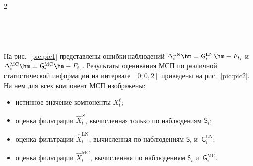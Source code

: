 \begin{multicols}{2}
\begin{figure*} %
  \vspace*{1pt}
\begin{center}
   \mbox{%
\epsfxsize=135.581mm 
}
\end{center}
\vspace*{-9pt}
\label{pic:pic1}
   \vspace*{6pt}
\begin{center}
   \mbox{%
\epsfxsize=135.178mm 
}
\end{center}
\vspace*{-9pt}
\label{pic:pic2}
\end{figure*}

На рис.~\ref{pic:pic1} представлены ошибки наблюдений $\Delta_i^{\mathrm{LN}}\hm = 
\mathsf{G}_i^{\mathrm{LN}} \hm- F_{t_i}$ и~$\Delta_i^{\mathrm{MC}}\hm = \mathsf{G}_i^{\mathrm{MC}}\hm - F_{t_i}$.
Результаты оценивания МСП по различной статистической информации на интервале 
$[0;0{,}2]$ приведены на рис.~\ref{pic:pic2}. На нем для всех компонент МСП 
изобра\-жены:\\[-14pt]
\begin{itemize}
\item
истинное значение компоненты $X_t^{\ell}$;\\[-14pt]
\item
оценка фильтрации $\widehat{X}_t^{S}$, вычисленная только по наблюдениям 
$\mathsf{S}_i$;\\[-14pt]
\item
оценка фильтрации $\widehat{X}_t^{\mathrm{LN}}$, вычисленная по наблюдениям 
$\mathsf{S}_i$ и~$\mathsf{G}_i^{\mathrm{LN}}$;\\[-14pt]
\item
оценка фильтрации $\widehat{X}_t^{\mathrm{MC}}$, вычисленная по наблюдениям 
$\mathsf{S}_i$ и~$\mathsf{G}_i^{\mathrm{MC}}$.
\end{itemize}

\pagebreak
 
  


\end{multicols}

